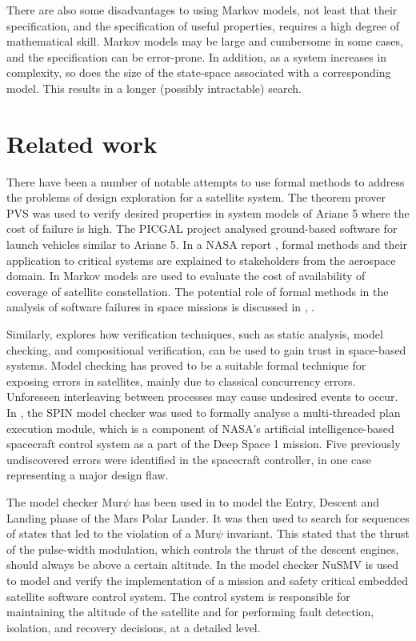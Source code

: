 \documentclass[preprint,12pt]{qrei}
\begin{document}
There are also some disadvantages to using Markov models, not least that their specification, and the specification of useful properties, requires a high degree of mathematical skill. Markov models may be large and cumbersome in some cases, and the specification can be error-prone. In addition, as a system increases in complexity, so does the size of the state-space associated with a corresponding model. This results in a longer (possibly intractable) search.



\section{Related work}
\label{sect:relatedWork}

There have been a number of notable attempts to use formal methods to address the problems of design exploration for a satellite system. The theorem prover PVS \cite{ORS92} was used to verify desired properties in system models of Ariane 5 where the cost of failure is high. The PICGAL project \cite{DLV97} analysed ground-based software for launch vehicles similar to Ariane 5. In a NASA report \cite{Rus97}, formal methods and their application to critical systems are explained to stakeholders from the aerospace domain. In \cite{CD04} Markov models are used to evaluate the cost of availability of coverage of satellite constellation. The potential role of formal methods in the analysis of software failures in space missions is discussed in \cite{Joh05}, .

Similarly, \cite{BDG+06} explores how verification techniques, such as static analysis, model checking, and compositional verification, can be used to gain trust in space-based systems. Model checking has proved to be a suitable formal technique for exposing errors in satellites, mainly due to classical concurrency errors. Unforeseen interleaving between processes may cause undesired events to occur. In \cite{HLP01}, the SPIN model checker \cite{Hol04} was used to formally analyse a multi-threaded plan execution module, which is a component of NASA's artificial intelligence-based spacecraft control system as a part of the Deep Space 1 mission. Five previously undiscovered errors were identified in the spacecraft controller, in one case representing a major design flaw.

The model checker Mur$\psi$ \cite{DDH+92} has been used in \cite{She01} to model the Entry, Descent and Landing phase of the Mars Polar Lander. It was then used to search for sequences of states that led to the violation of a Mur$\psi$ invariant. This stated that the thrust of the pulse-width modulation, which controls the thrust of the descent engines, should always be above a certain altitude. In \cite{GDH13} the model checker NuSMV \cite{CCG+02} is used to model and verify the implementation of a mission and safety critical embedded satellite software control system. The control system is responsible for maintaining the altitude of the satellite and for performing fault detection, isolation, and recovery decisions, at a detailed level.
\end{document}
